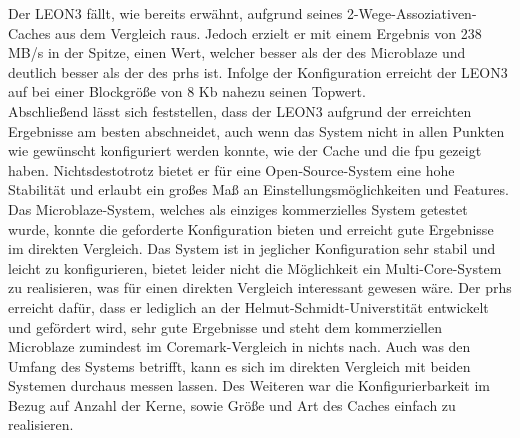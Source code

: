 \newpage
 Der LEON3 fällt, wie bereits erwähnt, aufgrund seines 2-Wege-Assoziativen-Caches aus dem Vergleich raus. Jedoch erzielt
er mit einem Ergebnis von 238 MB/s in der Spitze, einen Wert, welcher besser als der des Microblaze und deutlich besser als der des \ac{prhs} ist. Infolge der
Konfiguration erreicht der LEON3 auf bei einer Blockgröße von 8 Kb nahezu seinen Topwert.\\
Abschließend lässt sich feststellen, dass der LEON3 aufgrund der erreichten Ergebnisse am besten abschneidet, auch wenn das System nicht in allen Punkten
wie gewünscht konfiguriert werden konnte, wie der Cache und die \ac{fpu} gezeigt haben. Nichtsdestotrotz bietet er für eine Open-Source-System eine hohe Stabilität
und erlaubt ein großes Maß an Einstellungsmöglichkeiten und Features. Das Microblaze-System, welches als einziges kommerzielles System getestet wurde, konnte die geforderte
Konfiguration bieten und erreicht gute Ergebnisse im direkten Vergleich. Das System ist in jeglicher Konfiguration sehr stabil und leicht zu konfigurieren, bietet
leider nicht die Möglichkeit ein Multi-Core-System zu realisieren, was für einen direkten Vergleich interessant gewesen wäre. Der \ac{prhs} erreicht dafür, dass er
lediglich an der Helmut-Schmidt-Universtität entwickelt und gefördert wird, sehr gute Ergebnisse und steht dem kommerziellen Microblaze zumindest im Coremark-Vergleich
in nichts nach. Auch was den Umfang des Systems betrifft, kann es sich im direkten Vergleich mit beiden Systemen durchaus messen lassen. Des Weiteren war die
Konfigurierbarkeit im Bezug auf Anzahl der Kerne, sowie Größe und Art des Caches einfach zu realisieren.\\
